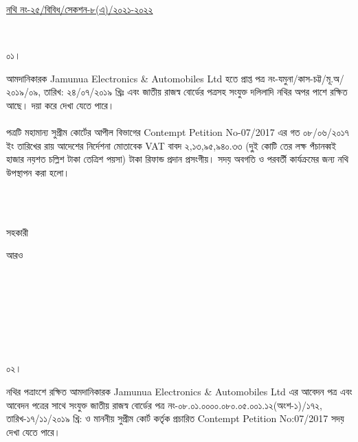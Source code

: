 \documentclass[12pt]{article}
\newcommand{\fileno}{নথি নং-২৫/বিবিধ/সেকশন-৮(এ)/২০২১-২০২২}
\newcommand{\nbrl}{নং-০৮.০১.০০০০.০৮০.০৫.০০১.১২(অংশ-১)/১৭২, তারিখ-১৭/১১/২০১৯ খ্রি:}
\newcommand{\tvat}{২,১৩,৯৫,৯৪০.৩৩ (দু্ই কোটি তের লক্ষ পঁচানব্বই হাজার নয়শত চল্লিশ টাকা তেত্রিশ পয়সা) টাকা}
\begin{document}
\begin{minipage}[t]{0.59\linewidth}
\hspace{0.5em}
\end{minipage}
\begin{minipage}[t]{1\textwidth}
\underline{{\fileno}}
\end{minipage}
\\
\begin{minipage}[t]{0.05\linewidth}
০১।
\end{minipage}
\begin{minipage}[t]{1\linewidth}
আমদানিকারক
Jamunua Electronics \& Automobiles Ltd
হতে প্রাপ্ত
পত্র নং-যমুনা/কাস-চট্ট/মূ.অ/২০১৯/০৯,
তারিখ: ২৪/০৭/২০১৯ খ্রিঃ
এবং জাতীয় রাজস্ব বোর্ডের পত্রসহ সংযুক্ত
দলিলাদি নথির অপর পাশে রক্ষিত আছে।
দয়া করে দেখা যেতে পারে।
\\
\\
পত্রটি মহামান্য সুপ্রীম কোর্টের আপীল বিভাগের
Contempt Petition No-07/2017
এর গত ০৮/০৬/২০১৭ ইং তারিখের
রায় আদেশের নির্দেশনা মোতাবেক
VAT বাবদ
{\tvat} রিফান্ড প্রদান প্রসংগীয়।
সদয় অবগতি ও পরবর্তী কার্যক্রমের জন্য
নথি উপস্থাপন করা হলো।
\end{minipage}
\\
\\
\begin{minipage}[t]{0.05\linewidth}
\hspace{1em}
\end{minipage}
\begin{minipage}[t]{.5\linewidth}
সহকারী
\end{minipage}
\begin{minipage}[t]{1\linewidth}
আরও
\end{minipage}
\\
\\
\\
\\
\\
\\
\begin{minipage}[t]{0.05\linewidth}
০২।
\end{minipage}
\begin{minipage}[t]{1\linewidth}
নথির পত্রাংশে রক্ষিত আমদানিকারক
Jamunua Electronics \& Automobiles Ltd
এর আবেদন পত্র এবং আবেদন পত্রের সাথে সংযুক্ত
জাতীয় রাজস্ব বোর্ডের পত্র
{\nbrl} ও মাননীয় সুপ্রীম কোর্ট কর্তৃক প্রচারিত
Contempt Petition No:07/2017
সদয় দেখা যেতে পারে।
\end{minipage}
\\
\\
\\
\end{document}
